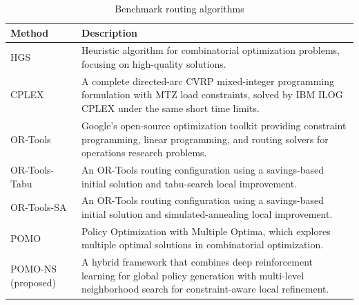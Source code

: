 \documentclass[preprint,12pt,authoryear]{elsarticle}
\theoremstyle{definition}
\begin{document}
\begin{table}[h]
\centering
\caption{Benchmark routing algorithms}
\label{tab:routing_methods}
\small
\renewcommand{\arraystretch}{1.12}
\begin{tabularx}{\textwidth}{@{}>{\raggedright\arraybackslash}p{3.2cm}X@{}}
\toprule
\textbf{Method} & \textbf{Description} \\
\midrule
HGS \citep{vidal2022hybrid} 
& Heuristic algorithm for combinatorial optimization problems, focusing on high-quality solutions. \\

CPLEX \citep{bixby2002solving} 
& A complete directed-arc CVRP mixed-integer programming formulation with MTZ load constraints, solved by IBM ILOG CPLEX under the same short time limits. \\

OR-Tools \citep{crainic1988or} 
& Google's open-source optimization toolkit providing constraint programming, linear programming, and routing solvers for operations research problems. \\

OR-Tools-Tabu 
& An OR-Tools routing configuration using a savings-based initial solution and tabu-search local improvement. \\

OR-Tools-SA 
& An OR-Tools routing configuration using a savings-based initial solution and simulated-annealing local improvement. \\

POMO \citep{kwon2020pomo} 
& Policy Optimization with Multiple Optima, which explores multiple optimal solutions in combinatorial optimization. \\

POMO-NS (proposed) 
& A hybrid framework that combines deep reinforcement learning for global policy generation with multi-level neighborhood search for constraint-aware local refinement. \\
\bottomrule
\end{tabularx}
\end{table}


 
\end{document}
